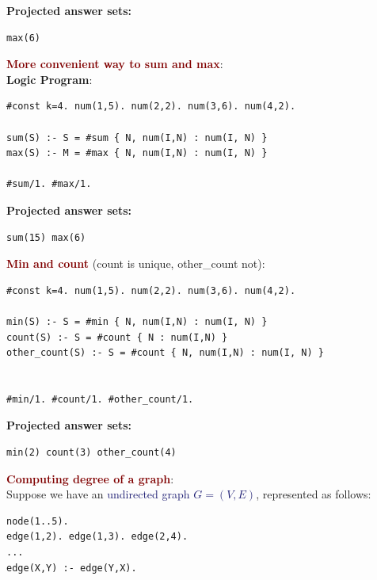 \textbf{Projected answer sets:}
\begin{lstlisting}
max(6)
\end{lstlisting}

\vspace{0.35cm}

{\Large \textbf{\textcolor{Maroon}{More convenient way to sum and max}}}: \\
\textbf{Logic Program}:
\begin{lstlisting}
#const k=4. num(1,5). num(2,2). num(3,6). num(4,2).

sum(S) :- S = #sum { N, num(I,N) : num(I, N) }
max(S) :- M = #max { N, num(I,N) : num(I, N) }

#sum/1. #max/1.
\end{lstlisting}

\vspace{0.25cm}

\textbf{Projected answer sets:}
\begin{lstlisting}
sum(15) max(6)
\end{lstlisting}

\vspace{0.35cm}

{\Large \textbf{\textcolor{Maroon}{Min and count}} (count is unique, other\_count not)}:
\begin{lstlisting}
#const k=4. num(1,5). num(2,2). num(3,6). num(4,2).

min(S) :- S = #min { N, num(I,N) : num(I, N) }
count(S) :- S = #count { N : num(I,N) }
other_count(S) :- S = #count { N, num(I,N) : num(I, N) }


#min/1. #count/1. #other_count/1.
\end{lstlisting}

\vspace{0.25cm}

\textbf{Projected answer sets:}
\begin{lstlisting}
min(2) count(3) other_count(4)
\end{lstlisting}

\vspace{0.35cm}

{\Large \textbf{\textcolor{Maroon}{Computing degree of a graph}}}: \\
Suppose we have an \textcolor{MidnightBlue}{undirected graph $G = (V,E)$}, represented as follows:
\begin{lstlisting}
node(1..5).
edge(1,2). edge(1,3). edge(2,4).
...
edge(X,Y) :- edge(Y,X).
\end{lstlisting}

